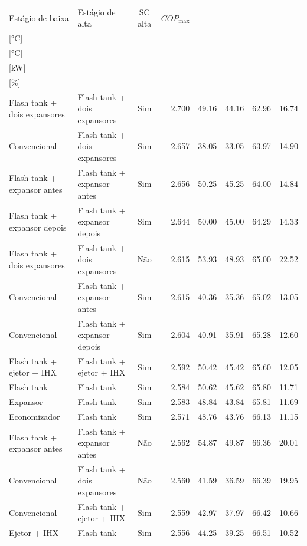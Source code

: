{\small\setlength{\tabcolsep}{4pt}\renewcommand{\arraystretch}{1.12}
\begin{tabular}{llcrrrrr}
\toprule
Estágio de baixa & Estágio de alta & SC alta & $COP_{\max}$ & \shortstack{$T_{\mathrm{cond,l}}^*$\\{[°C]}} & \shortstack{$T_{\mathrm{evap,h}}^*$\\{[°C]}} & \shortstack{$\dot W_{\mathrm{liq}}$\\{[kW]}} & \shortstack{$\Delta COP_{\mathrm{opt}}$\\{[\%]}} \\
\midrule
Flash tank + dois expansores & Flash tank + dois expansores & Sim & 2.700 & 49.16 & 44.16 & 62.96 & 16.74 \\
Convencional & Flash tank + dois expansores & Sim & 2.657 & 38.05 & 33.05 & 63.97 & 14.90 \\
Flash tank + expansor antes & Flash tank + expansor antes & Sim & 2.656 & 50.25 & 45.25 & 64.00 & 14.84 \\
Flash tank + expansor depois & Flash tank + expansor depois & Sim & 2.644 & 50.00 & 45.00 & 64.29 & 14.33 \\
Flash tank + dois expansores & Flash tank + dois expansores & Não & 2.615 & 53.93 & 48.93 & 65.00 & 22.52 \\
Convencional & Flash tank + expansor antes & Sim & 2.615 & 40.36 & 35.36 & 65.02 & 13.05 \\
Convencional & Flash tank + expansor depois & Sim & 2.604 & 40.91 & 35.91 & 65.28 & 12.60 \\
Flash tank + ejetor + IHX & Flash tank + ejetor + IHX & Sim & 2.592 & 50.42 & 45.42 & 65.60 & 12.05 \\
Flash tank & Flash tank & Sim & 2.584 & 50.62 & 45.62 & 65.80 & 11.71 \\
Expansor & Flash tank & Sim & 2.583 & 48.84 & 43.84 & 65.81 & 11.69 \\
Economizador & Flash tank & Sim & 2.571 & 48.76 & 43.76 & 66.13 & 11.15 \\
Flash tank + expansor antes & Flash tank + expansor antes & Não & 2.562 & 54.87 & 49.87 & 66.36 & 20.01 \\
Convencional & Flash tank + dois expansores & Não & 2.560 & 41.59 & 36.59 & 66.39 & 19.95 \\
Convencional & Flash tank + ejetor + IHX & Sim & 2.559 & 42.97 & 37.97 & 66.42 & 10.66 \\
Ejetor + IHX & Flash tank & Sim & 2.556 & 44.25 & 39.25 & 66.51 & 10.52 \\

\end{tabular}}
